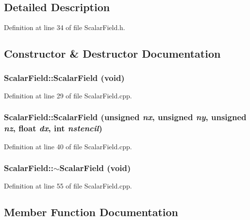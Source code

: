 \subsection{Detailed Description}


Definition at line 34 of file ScalarField.h.



\subsection{Constructor \& Destructor Documentation}
\subsubsection[{ScalarField}]{\setlength{\rightskip}{0pt plus 5cm}ScalarField::ScalarField (void)}\label{classScalarField_a96be7ab68de0ac5b4b787a21ea0d1226}


Definition at line 29 of file ScalarField.cpp.

\subsubsection[{ScalarField}]{\setlength{\rightskip}{0pt plus 5cm}ScalarField::ScalarField (unsigned {\em nx}, \/  unsigned {\em ny}, \/  unsigned {\em nz}, \/  float {\em dx}, \/  int {\em nstencil})}\label{classScalarField_ac6fe0f415f8669a5c2f32bb20c4ffcdd}


Definition at line 40 of file ScalarField.cpp.

\subsubsection[{$\sim$ScalarField}]{\setlength{\rightskip}{0pt plus 5cm}ScalarField::$\sim$ScalarField (void)}\label{classScalarField_a930ebe53ad6b9d5496d955ca57f6629f}


Definition at line 55 of file ScalarField.cpp.



\subsection{Member Function Documentation}
